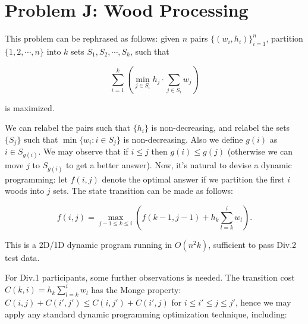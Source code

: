 \documentclass[a4paper,10.5pt,twoside]{article}
\begin{document}
\section*{Problem J: Wood Processing}

This problem can be rephrased as follows: given $n$ pairs $\{(w_i, h_i)\}_{i=1}^n$, partition $\{1, 2, \cdots, n\}$ into $k$ sets $S_1, S_2, \cdots, S_k$, such that 

$$ \sum_{i=1}^k \left(\min_{j \in S_i} h_j \cdot \sum_{j \in S_i} w_j \right) $$

is maximized.

We can relabel the pairs such that $\{h_i\}$ is non-decreasing, and relabel the sets $\{S_j\}$ such that $\min\{w_i : i \in S_j\}$ is non-decreasing. Also we define $g(i)$ as $i \in S_{g(i)}$. We may observe that if $i \leq j$ then $g(i) \leq g(j)$ (otherwise we can move $j$ to $S_{g(i)}$ to get a better answer). Now, it's natural to devise a dynamic programming: let $f(i,j)$ denote the optimal answer if we partition the first $i$ woods into $j$ sets. The state transition can be made as follows:

$$ f(i,j) = \max_{j-1 \leq k \leq i} \left( f(k-1, j-1) + h_{k} \sum_{l = k}^i w_l \right). $$

This is a 2D/1D dynamic program running in $O(n^2 k)$, sufficient to pass Div.2 test data. 

For Div.1 participants, some further observations is needed. The transition cost $C(k, i) = h_{k} \sum_{l = k}^i w_l$ has the Monge property: $C(i, j) + C(i', j') \leq C(i, j') + C(i', j)$ for $i \leq i' \leq j \leq j'$, hence we may apply any standard dynamic programming optimization technique, including:
\end{document}
